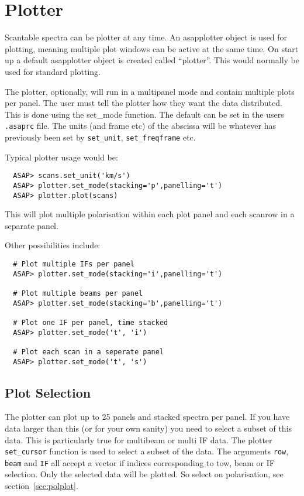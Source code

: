 \documentclass[11pt]{article}
\newcommand{\cmd}[1]{{\tt #1}}
\begin{document}
\section{Plotter}

Scantable spectra can be plotter at any time. An asapplotter object is
used for plotting, meaning multiple plot windows can be active at the
same time. On start up a default asapplotter object is created called
``plotter''. This would normally be used for standard plotting.

The plotter, optionally, will run in a multipanel mode and contain
multiple plots per panel. The user must tell the plotter how they want
the data distributed. This is done using the set\_mode function. The
default can be set in the users {\tt .asaprc} file. The units (and frame
etc) of the abscissa will be whatever has previously been set by
\cmd{set\_unit}, \cmd{set\_freqframe} etc.

Typical plotter usage would be:

\begin{verbatim}
  ASAP> scans.set_unit('km/s')
  ASAP> plotter.set_mode(stacking='p',panelling='t')
  ASAP> plotter.plot(scans)
\end{verbatim}

This will plot multiple polarisation within each plot panel and each
scanrow in a separate panel.

Other possibilities include:

\begin{verbatim}
  # Plot multiple IFs per panel
  ASAP> plotter.set_mode(stacking='i',panelling='t')

  # Plot multiple beams per panel
  ASAP> plotter.set_mode(stacking='b',panelling='t')

  # Plot one IF per panel, time stacked
  ASAP> plotter.set_mode('t', 'i')

  # Plot each scan in a seperate panel
  ASAP> plotter.set_mode('t', 's')

\end{verbatim}

\subsection{Plot Selection}
\label{sec:plotter_cursor}

The plotter can plot up to 25 panels and stacked spectra per
panel. If you have data larger than this (or for your own sanity) you
need to select a subset of this data. This is particularly true for
multibeam or multi IF data. The plotter \cmd{set\_cursor} function is
used to select a subset of the data. The arguments \cmd{row},
\cmd{beam} and \cmd{IF} all accept a vector if indices corresponding
to tow, beam or IF selection. Only the selected data will be plotted.
So select on polarisation, see section~\ref{sec:polplot}.
\end{document}
